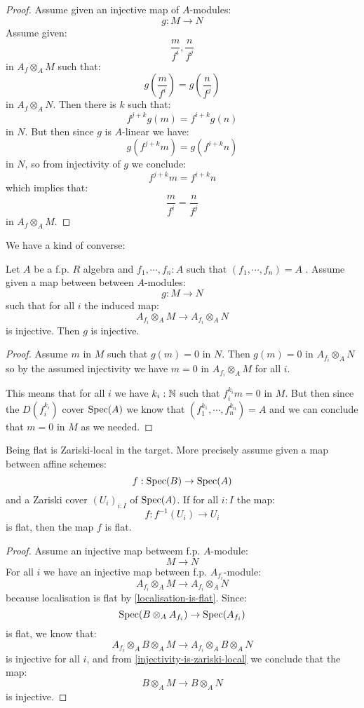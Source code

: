 \begin{proof}
Assume given an injective map of $A$-modules:
\[g:M\to N\]
Assume given:
\[\frac{m}{f^i},\frac{n}{f^j}\]
in $A_f\otimes_AM$ such that:
\[g(\frac{m}{f^i}) = g(\frac{n}{f^j})\]
in $A_f\otimes_AN$. Then there is $k$ such that:
\[f^{j+k}g(m) = f^{i+k}g(n)\]
in $N$. But then since $g$ is $A$-linear we have:
\[g(f^{j+k}m) = g(f^{i+k}n)\]
in $N$, so from injectivity of $g$ we conclude:
\[f^{j+k}m = f^{i+k}n\]
which implies that:
\[\frac{m}{f^i} = \frac{n}{f^j}\]
in $A_f\otimes_AM$.
\end{proof}

We have a kind of converse:

\begin{lemma}\label{injectivity-is-zariski-local}
Let $A$ be a f.p. $R$ algebra and $f_1,\cdots,f_n:A$ such that $(f_1,\cdots,f_n) = A$ . Assume given a map between between $A$-modules:
\[g:M\to N\] 
such that for all $i$ the induced map:
\[A_{f_i}\otimes_AM \to A_{f_i}\otimes_AN\]
is injective. Then $g$ is injective.
\end{lemma}

\begin{proof}
Assume $m$ in $M$ such that $g(m)=0$ in $N$. Then $g(m) =0$ in $A_{f_i}\otimes_AN$ so by the assumed injectivity we have $m=0$ in $A_{f_i}\otimes_AM$ for all $i$.

This means that for all $i$ we have $k_i:\mathbb{N}$ such that $f_i^{k_i}m = 0$ in $M$. But then since the $D(f_i^{k_i})$ cover $\operatorname{Spec}(A)$ we know that $(f_1^{k_1},\cdots,f_n^{k_n}) = A$ and we can conclude that $m=0$ in $M$ as we needed.
\end{proof}

\begin{lemma}\label{flat-zariski-local}
Being flat is Zariski-local in the target. More precisely assume given a map between affine schemes:
\[f:\operatorname{Spec}(B)\to \operatorname{Spec}(A)\]
and a Zariski cover $(U_i)_{i:I}$ of $\operatorname{Spec}(A)$. If for all $i:I$ the map:
\[f : f^{-1}(U_i)\to U_i\]
is flat, then the map $f$ is flat.
\end{lemma}

\begin{proof}
Assume an injective map betweem f.p. $A$-module:
\[M\to N\]
For all $i$ we have an injective map between f.p. $A_{f_i}$-module:
\[A_{f_i}\otimes_AM\to A_{f_i}\otimes_AN\]
because localisation is flat by \cref{localisation-is-flat}. Since:
\[\operatorname{Spec}(B\otimes_AA_{f_i})\to \operatorname{Spec}(A_{f_i})\]
is flat, we know that:
\[A_{f_i}\otimes_AB\otimes_AM\to A_{f_i}\otimes_AB\otimes_AN\]
is injective for all $i$, and from \cref{injectivity-is-zariski-local} we conclude that the map:
\[B\otimes_AM\to B\otimes_AN\]
is injective.
\end{proof}


